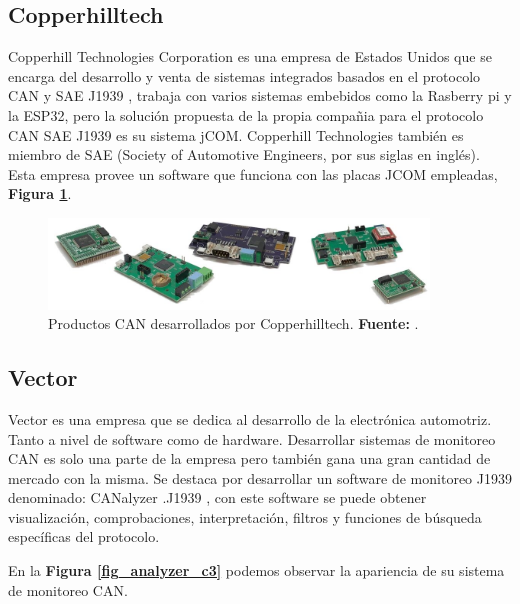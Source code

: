 \subsection{Copperhilltech}
Copperhill Technologies Corporation es una empresa de Estados Unidos que se encarga del desarrollo y venta de sistemas integrados basados en el protocolo CAN y SAE J1939 \cite{cite_copper_c3}, trabaja con varios sistemas embebidos como la Rasberry pi y la ESP32,  pero la solución propuesta de la propia compañia  para el protocolo CAN SAE J1939 es su sistema jCOM.   Copperhill Technologies también es miembro de SAE (Society of Automotive Engineers, por sus siglas en inglés). Esta empresa provee un software que funciona con las placas JCOM empleadas, \textbf{Figura \ref{fig_copper_c3}}. 


\begin{figure}[H]
	\centering
	\includegraphics[width=0.9\textwidth]{./Cap3imagen/copperhill.jpg}
	\caption[Productos CAN desarrollados por Copperhilltech .]{Productos CAN desarrollados por Copperhilltech.\textbf{ Fuente:} \cite{cite_copper_c3}.}
	\label{fig_copper_c3} %
\end{figure}

\subsection{Vector}
Vector es una empresa que se dedica al  desarrollo de la electrónica automotriz.  Tanto a nivel de software como de hardware. Desarrollar sistemas de monitoreo CAN es solo una parte de la empresa pero también gana una gran cantidad de mercado con la misma. Se destaca por desarrollar un software de monitoreo J1939 denominado: CANalyzer .J1939 \cite{cite_analyzer_c3}, con este software se puede obtener visualización, comprobaciones, interpretación, filtros y funciones de búsqueda específicas del protocolo. 

En la \textbf{Figura \ref{fig_analyzer_c3}} podemos observar la apariencia de su sistema de monitoreo CAN. 


